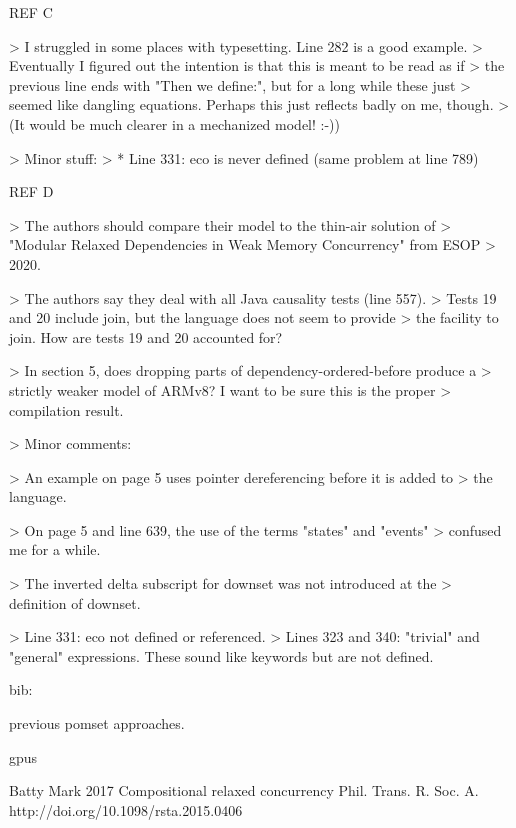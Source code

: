 \documentclass[acmsmall,review,anonymous,screen]{acmart}\settopmatter{printfolios=true}
\theoremstyle{acmdefinition}
\begin{document}
REF C

> I struggled in some places with typesetting. Line 282 is a good example.
> Eventually I figured out the intention is that this is meant to be read as if
> the previous line ends with "Then we define:", but for a long while these just
> seemed like dangling equations. Perhaps this just reflects badly on me, though.
> (It would be much clearer in a mechanized model! :-))

> Minor stuff:
> * Line 331: eco is never defined (same problem at line 789)



REF D

> The authors should compare their model to the thin-air solution of
> "Modular Relaxed Dependencies in Weak Memory Concurrency" from ESOP
> 2020.

> The authors say they deal with all Java causality tests (line 557).
> Tests 19 and 20 include join, but the language does not seem to provide
> the facility to join. How are tests 19 and 20 accounted for?

> In section 5, does dropping parts of dependency-ordered-before produce a
> strictly weaker model of ARMv8? I want to be sure this is the proper
> compilation result.


> Minor comments:

> An example on page 5 uses pointer dereferencing before it is added to
> the language.

> On page 5 and line 639, the use of the terms "states" and "events"
> confused me for a while.

> The inverted delta subscript for downset was not introduced at the
> definition of downset.


> Line 331: eco not defined or referenced.
> Lines 323 and 340: "trivial" and "general" expressions. These sound like keywords but are not defined.




bib:

\cite{DBLP:journals/lmcs/KavanaghB19} previous pomset approaches.

\cite{10.1145/2694344.2694391} gpus

Batty Mark 2017
Compositional relaxed concurrency
Phil. Trans. R. Soc. A.
http://doi.org/10.1098/rsta.2015.0406
\end{document}
